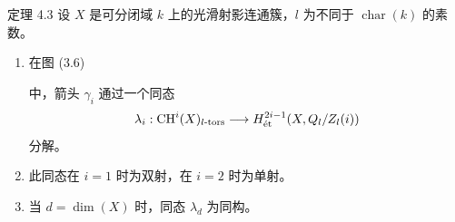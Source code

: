 \begin{statement}{定理 4.3}
设 $X$ 是可分闭域 $k$ 上的光滑射影连通簇，$l$ 为不同于 $\operatorname{char}(k)$ 的素数。
\begin{enumerate}[label=(\roman*)]
\item 在图 (3.6)
\begin{center}
\end{center}
中，箭头 $\gamma_i$ 通过一个同态
\[
\lambda_i:\operatorname{CH}^i(X)_{l\text{-}\mathrm{tors}}\longrightarrow H^{2i-1}_{\mathrm{\acute et}}(X,Q_l/Z_l(i))
\]
分解。
\item 此同态在 $i=1$ 时为双射，在 $i=2$ 时为单射。
\item 当 $d=\dim(X)$ 时，同态 $\lambda_d$ 为同构。
\end{enumerate}
\end{statement}
